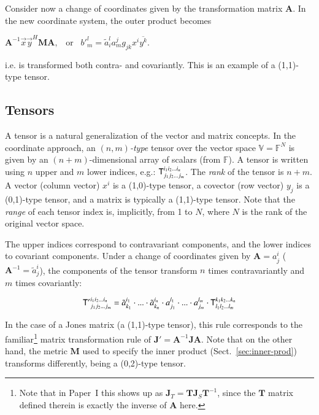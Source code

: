 \documentclass{aa}
\newcommand{\herm}{H}
\begin{document}
Consider now a change of coordinates given by the transformation matrix $\mathbf{A}$. In the new coordinate system, the outer product becomes

$\mathbf{A}^{-1}\vec x \vec y^\herm \mathbf{M} \mathbf{A}, \;\;\;\mbox{or}\;\;\;b'^{l}_{m} = \tilde a_i^{l}a_m^{j} g_{jk} x^i \overline{y^k}$.

i.e. is transformed both contra- and covariantly. This is an example of a (1,1)-type tensor.

\subsection{Tensors}
\label{sec:tensors}

A tensor is a natural generalization of the vector and matrix concepts. In the coordinate approach, an \emph{$(n,m)$-type} tensor over the vector space $\mathbb{V}=\mathbb{F}^N$ is given by an $(n+m)$-dimensional array of scalars (from $\mathbb{F}$). A tensor is written using $n$ upper and $m$ lower indices, e.g.: $\mathsf{T}_{j_{1}j_{2}...j_{m}}^{i_{1}i_{2}...i_{n}}$. The \emph{rank} of the tensor is $n+m$. A vector (column vector) $x^i$ is a (1,0)-type tensor, a covector (row vector) $y_j$ is a (0,1)-type tensor, and a matrix is typically a (1,1)-type tensor. Note that the \emph{range} of each tensor index is, implicitly, from 1 to $N$, where $N$ is the rank of the original vector space. 

The upper indices correspond to contravariant components, and the lower indices to covariant components. Under a change of coordinates given by $\mathbf{A}=a^i_j$ ($\mathbf{A}^{-1}=\tilde a^i_j$), the components of the tensor transform $n$ times contravariantly and $m$ times covariantly: 

\begin{equation}
  \label{eq:tensor-coord-xform}
\mathsf{T'}_{j_1j_2...j_m}^{i_1i_2...i_n} = 
\tilde a^{i_1}_{k_1}\cdot...\cdot\tilde a^{i_n}_{k_n} \cdot 
a_{j_1}^{l_1}\cdot...\cdot a_{j_m}^{l_m} \cdot
\mathsf{T}_{l_1l_2...l_m}^{k_1k_2...k_n} 
\end{equation}

In the case of a Jones matrix (a (1,1)-type tensor), this rule corresponds to the familiar\footnote{Note that in Paper~I \citep[Sect.~6.3]{RRIME1} this shows up as $\mathbf{J}_T=\mathbf{T}\mathbf{J}_S\mathbf{T}^{-1}$, since the $\mathbf{T}$ matrix defined therein is exactly the inverse of $\mathbf{A}$ here.} matrix transformation rule of $\mathbf{J}'=\mathbf{A}^{-1}\mathbf{J}\mathbf{A}.$ Note that on the other hand, the metric $\mathbf{M}$ used to specify the inner product (Sect.~\ref{sec:inner-prod}) transforms differently, being a (0,2)-type tensor.
\end{document}
